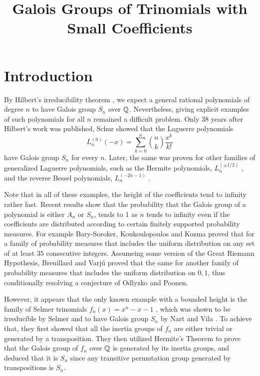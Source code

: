 \documentclass[../main.tex]{subfiles}
\begin{document}
\title{
  Galois Groups of Trinomials with Small Coefficients
}
\maketitle
  
\localtableofcontents
\section{Introduction}
By Hilbert's irreducibility theorem \cite{Hilbert}, we expect a general rational polynomials of degree $n$ to have Galois group $S_n$ over $\mathbb{Q}$.
Nevertheless, giving explicit examples of such polynomials for all $n$ remained a difficult problem.
Only 38 years after Hilbert's work was published, Schur \cite{schur1931affectless} showed that the Laguerre polynomials 
\[
  L_n^{\left( 0 \right)}\left( -x \right) = \sum_{k=0}^n \binom{n}{k} \frac{x^k}{k!}
\]
have Galois group $S_n$ for every $n$.
Later, the same was proven for other families of generalized Laguerre polynomials, such as the Hermite polynomials, $L^{\left( \pm 1/2 \right)}_n$ \cite{schur1931affectless}, and the reverse Bessel polynomials, $L^{\left( -2n-1 \right)}_n$ \cite{grosswald1978bessel} \cite{filaseta2002irreducibility}.

Note that in all of these examples, the height of the coefficients tend to infinity rather fast.
Recent results show that the probability that the Galois group of a polynomial is either $A_n$ or $S_n$, tends to 1 as $n$ tends to infinity even if the coefficients are distributed according to certain finitely supported probability measures.
For example Bary-Soroker, Koukoulopoulos and Kozma \cite{Bary_Soroker_2023} proved that for a family of probability measures that includes the uniform distribution on any set of at least $35$ consecutive integers.
Assumeing some version of the Great Riemann Hypothesis, Breuillard and Varj\'{u} \cite{Breuillard_2019} proved that the same for another family of probability measures that includes the uniform distribution on ${0, 1}$, thus conditionally resolving a conjecture of Odlyzko and Poonen.

However, it appears that the only known example with a bounded height is the family of Selmer trinomials $f_n\left( x \right) = x^n - x - 1$ , which was shown to be irreducible by Selmer \cite{SelmerIrreducibility1956} and to have Galois group $S_n$ by Nart and Vila \cite{NartVila1979}. 
To achieve that, they first showed that all the inertia groups of $f_n$ are either trivial or generated by a transposition.
They then utilized Hermite's Theorem to prove that the Galois group of $f_n$ over $\mathbb{Q}$ is generated by its inertia groups, and deduced that it is $S_n$ since any transitive permutation group generated by transpositions is $S_n$.
\end{document}
